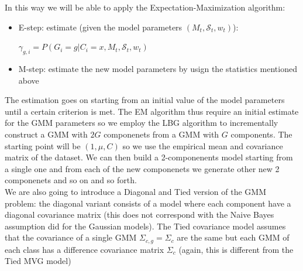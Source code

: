 \documentclass[10pt, a4paper, twocolumn]{article} %
\begin{document}
In this way we will be able to apply the Expectation-Maximization algorithm:
\begin{itemize}
	\item E-step: estimate (given the model parameters $(M_t,\mathcal{S}_t,w_t)$):
			\begin{center}
				$\gamma_{g,i}=P(G_i=g|C_i=x,M_t,\mathcal{S}_t,w_t)$ 
			\end{center}
	\item M-step: estimate the new model parameters by usign the statistics mentioned above
\end{itemize}
The estimation goes on starting from an initial value of the model parameters until a certain
criterion is met. The EM algorithm thus require an initial estimate for the GMM parameters so
we employ the LBG algorithm to incrementally construct a  GMM with $2G$ componenets from a 
GMM with $G$ components. The starting point will be $(1, \mu, C)$ so we use the empirical
mean and covariance matrix of the dataset. We can then build a 2-componenents model starting from
a single one and from each of the new componenets we generate other new 2 componenets and so on and so forth.
\\We are also going to introduce a Diagonal and Tied version of the GMM problem: the diagonal
variant consists of a model where each component have a diagonal covariance matrix (this does
not correspond with the Naive Bayes assumption did for the Gaussian models). The Tied covariance
model assumes that the covariance of a single GMM $\Sigma_{c,g} = \Sigma_c$ are the same but
each GMM of each class has a difference covariance matrix $\Sigma_c$ (again, this is different
from the Tied MVG model)
\end{document}
